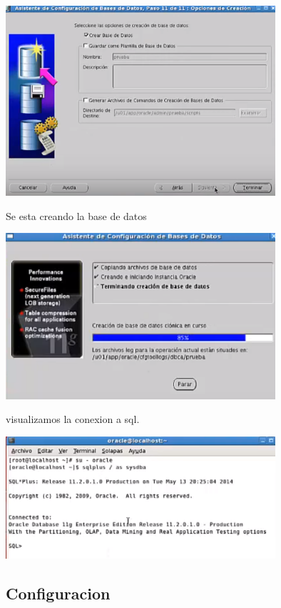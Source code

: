 \documentclass[12pt,letterpaper]{article}
\begin{document}
\begin{center}
\includegraphics[width=10cm]{oraclelinux/43.png}
\end{center}
Se esta creando la base de datos \\
\begin{center}
\includegraphics[width=10cm]{oraclelinux/44.png}
\end{center}
visualizamos la conexion a sql.
\begin{center}
\includegraphics[width=10cm]{oraclelinux/46.png}
\end{center}


\subsection{Configuracion}


\newpage
\end{document}

